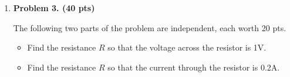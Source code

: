 \begin{enumerate}
\item {\bf Problem 3. (40 pts)}

  The following two parts of the problem are independent, each worth 20 pts.
  \begin{itemize}
    \item Find the resistance $R$ so that the voltage across the resistor is 1V.
    \item Find the resistance $R$ so that the current through the resistor is 0.2A.
  \end{itemize}

  










\end{enumerate}
